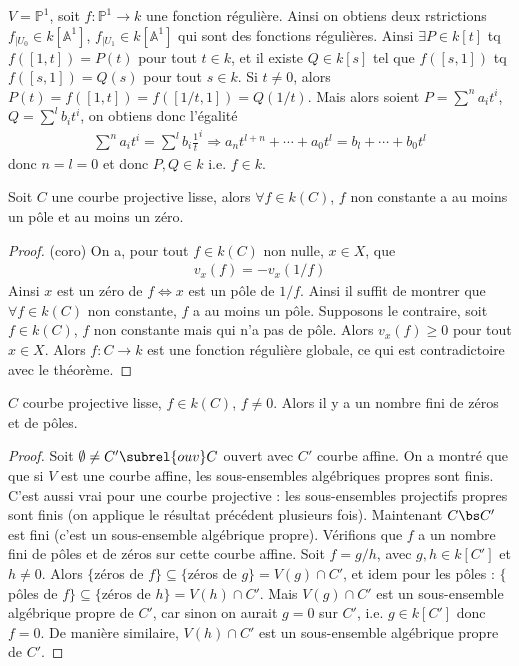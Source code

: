         \begin{expl}
            $V = \mathbb{P}^1$, soit $f : \mathbb{P}^1 \to k$ une fonction régulière. Ainsi on obtiens deux rstrictions $f_{|U_0} \in k[\mathbb{A}^1]$, $f_{|U_1} \in k[\mathbb{A}^1]$ qui sont des fonctions régulières. Ainsi $\exists P \in k[t]$ tq $f([1,t]) = P(t)$ pour tout $t \in k$, et il existe $Q \in k[s]$ tel que $f([s,1])$ tq $f([s,1]) = Q(s)$ pour tout $s \in k$. Si $t \neq 0$, alors $P(t) = f([1,t]) = f([1/t, 1]) = Q(1/t)$. Mais alors soient $P = \sum^n a_it^i$, $Q = \sum^l b_it^i$, on obtiens donc l'égalité
            \begin{align*}
                \sum^n a_it^i = \sum^l b_i\frac1t^i
                \Rightarrow a_n t^{l + n} + \cdots + a_0t^l = b_l + \cdots + b_0t^l
            \end{align*}
            donc $n = l = 0$ et donc $P,Q \in k$ i.e. $f \in k$.
        \end{expl}
        \begin{coro}
            Soit $C$ une courbe projective lisse, alors $\forall f \in k(C)$, $f$ non constante a au moins un pôle et au moins un zéro.
        \end{coro}
        \begin{proof} (coro)
            On a, pour tout $f \in k(C)$ non nulle, $x \in X$, que 
            \begin{align*}
                v_x(f) = - v_x(1/f)
            \end{align*}
            Ainsi $x$ est un zéro de $f \iff x$ est un pôle de $1/f$. Ainsi il suffit de montrer que $\forall f \in k(C)$ non constante, $f$ a au moins un pôle. Supposons le contraire, soit $f \in k(C)$, $f$ non constante mais qui n'a pas de pôle. Alors $v_x(f) \geq 0$ pour tout $x \in X$. Alors $f : C \to k$ est une fonction régulière globale,  ce qui est contradictoire avec le théorème. 
        \end{proof}
        \begin{prop}
            $C$ courbe projective lisse, $f \in k(C)$, $f \neq 0$. Alors il y a un nombre fini de zéros et de pôles.
        \end{prop}
        \begin{proof}
            Soit $\emptyset \neq C' \subrel{ouv} C$ ouvert avec $C'$ courbe affine. On a montré que que si $V$ est une courbe affine, les sous-ensembles algébriques propres sont finis. C'est aussi vrai pour une courbe projective  : les sous-ensembles projectifs propres sont finis (on applique le résultat précédent plusieurs fois). Maintenant $C \bs C'$ est fini (c'est un  sous-ensemble algébrique  propre). Vérifions que $f$ a un nombre fini de pôles et de zéros sur cette courbe affine. Soit $f = g/h$, avec $g,h \in k[C']$ et $h \neq 0$. Alors $\{$zéros de $f\} \subseteq \{$zéros de $g\} = V(g) \cap C'$, et idem pour les pôles : $\{$pôles de $f\} \subseteq \{$zéros de $h\} = V(h) \cap C'$. Mais $V(g) \cap C'$ est un sous-ensemble algébrique propre de $C'$, car sinon on aurait $g = 0$ sur $C'$, i.e. $g \in k[C']$ donc $f = 0$. De manière similaire, $V(h) \cap C'$ est un sous-ensemble algébrique propre de $C'$.
        \end{proof}
